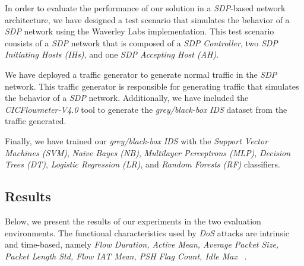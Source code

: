 In order to evaluate the performance of our solution in a \textit{SDP}-based network architecture, we have designed a
test scenario that simulates the behavior of a \textit{SDP} network using the Waverley Labs implementation.
This test scenario consists of a \textit{SDP} network that is composed of a \textit{SDP Controller}, two
\textit{SDP Initiating Hosts (IHs)}, and one \textit{SDP Accepting Host (AH)}.

We have deployed a traffic generator to generate normal traffic in the \textit{SDP} network.
This traffic generator is responsible for generating traffic that simulates the behavior of a \textit{SDP} network.
Additionally, we have included the \textit{CICFlowmeter-V4.0} tool to generate the \textit{grey/black-box} \textit{IDS}
dataset from the traffic generated.

Finally, we have trained our \textit{grey/black-box} \textit{IDS} with the \textit{Support Vector Machines (SVM)},
\textit{Naive Bayes (NB)}, \textit{Multilayer Perceptrons (MLP)}, \textit{Decision Trees (DT)},
\textit{Logistic Regression (LR)}, and \textit{Random Forests (RF)} classifiers.

\subsection{Results}\label{subsec:results}
Below, we present the results of our experiments in the two evaluation environments.
The functional characteristics used by \textit{DoS} attacks are intrinsic and time-based, namely \textit{Flow Duration,
    Active Mean, Average Packet Size, Packet Length Std, Flow IAT Mean, PSH Flag Count, Idle Max}
~\cite{CSE-CIC-IDS2018, usama2019generative}.

